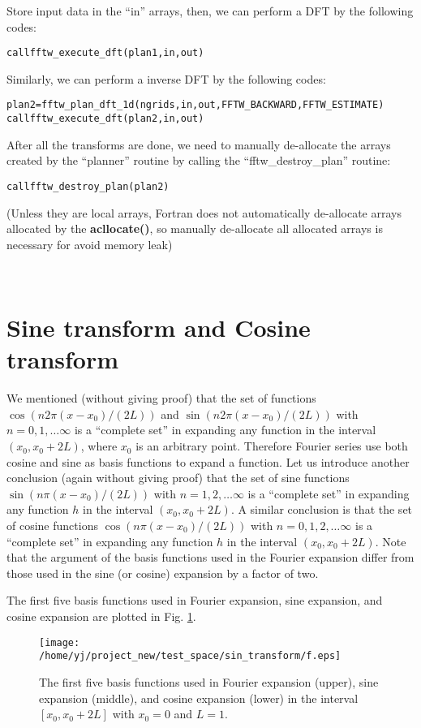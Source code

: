 \documentclass{article}
\newcommand{\codestar}[1]{\textbf{#1}}
\newenvironment{tmcode}[1][]{\begin{alltt} }{\end{alltt}}
\begin{document}
Store input data in the ``in'' arrays, then, we can perform a DFT by the
following codes:
\begin{tmcode}
call fftw_execute_dft(plan1, in, out)
\end{tmcode}
Similarly, we can perform a inverse DFT by the following codes:
\begin{tmcode}
plan2 = fftw_plan_dft_1d(ngrids, in,out,FFTW_BACKWARD,FFTW_ESTIMATE)
call fftw_execute_dft(plan2, in, out)
\end{tmcode}
After all the transforms are done, we need to manually de-allocate the arrays
created by the ``planner'' routine by calling the ``fftw\_destroy\_plan''
routine:
\begin{tmcode}
call fftw_destroy_plan(plan2)
\end{tmcode}
(Unless they are local arrays, Fortran does not automatically de-allocate
arrays allocated by the {\codestar{acllocate()}}, so manually de-allocate all
allocated arrays is necessary for avoid memory leak)

\

\section{Sine transform and Cosine transform}

We mentioned (without giving proof) that the set of functions $\cos (n 2 \pi
(x - x_0) / (2 L))$ and $\sin (n 2 \pi (x - x_0) / (2 L))$ with $n = 0, 1,
\ldots \infty$ is a ``complete set'' in expanding any function in the interval
$(x_0, x_0 + 2 L)$, where $x_0$ is an arbitrary point. Therefore Fourier
series use both cosine and sine as basis functions to expand a function. Let
us introduce another conclusion (again without giving proof) that the set of
sine functions $\sin (n \pi (x - x_0) / (2 L))$ with $n = 1, 2, \ldots \infty$
is a ``complete set'' in expanding any function $h$ in the interval $(x_0, x_0
+ 2 L)$. A similar conclusion is that the set of cosine functions $\cos (n \pi
(x - x_0) / (2 L))$ with $n = 0, 1, 2, \ldots \infty$ is a ``complete set'' in
expanding any function $h$ in the interval $(x_0, x_0 + 2 L)$. Note that the
argument of the basis functions used in the Fourier expansion differ from
those used in the sine (or cosine) expansion by a factor of two.

The first five basis functions used in Fourier expansion, sine expansion, and
cosine expansion are plotted in Fig. \ref{18-1-10-e1}.

\begin{figure}[h]
  \texttt{[image: /home/yj/project\_new/test\_space/sin\_transform/f.eps]}
  \caption{ \label{18-1-10-e1}The first five basis functions used in Fourier
  expansion (upper), sine expansion (middle), and cosine expansion (lower) in
  the interval $[x_0, x_0 + 2 L]$ with $x_0 = 0$ and $L = 1$.}
\end{figure}
\end{document}

